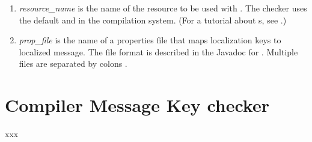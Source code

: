 \begin{enumerate}

\item {}

  \emph{resource\_name} is the name of the resource to be used with
  .
  The checker uses the default  and  in the
  compilation system.
  (For a tutorial about s, see
  .)

\item {}

  \emph{prop\_file} is the name of a properties file that maps
  localization keys to localized message.  The file format is described in
  the Javadoc for 
  .
  Multiple files are separated by colons \code{:}.

\end{enumerate}



\section{Compiler Message Key checker\label{compilermsgs-checker}}


xxx
